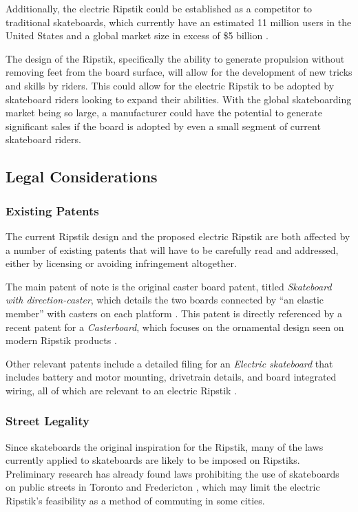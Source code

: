 Additionally, the electric Ripstik could be established as a competitor to traditional skateboards, which currently have an estimated 11 million users in the United States and a global market size in excess of \$5 billion \cite{Skateboarding}.

The design of the Ripstik, specifically the ability to generate propulsion without removing feet from the board surface, will allow for the development of new tricks and skills by riders. This could allow for the electric Ripstik to be adopted by skateboard riders looking to expand their abilities. With the global skateboarding market being so large, a manufacturer could have the potential to generate significant sales if the board is adopted by even a small segment of current skateboard riders.
\subsection{Legal Considerations}
\subsubsection{Existing Patents}
The current Ripstik design and the proposed electric Ripstik are both affected by a number of existing patents that will have to be carefully read and addressed, either by licensing or avoiding infringement altogether. 

The main patent of note is the original caster board patent, titled \textit{Skateboard with direction-caster}, which details the two boards connected by ``an elastic member'' with casters on each platform \cite{directionCasterPatent}. This patent is directly referenced by a recent patent for a \textit{Casterboard}, which focuses on the ornamental design seen on modern Ripstik products \cite{casterboardPatent}.

Other relevant patents include a detailed filing for an \textit{Electric skateboard} that includes battery and motor mounting, drivetrain details, and board integrated wiring, all of which are relevant to an electric Ripstik \cite{electricSkateboardPatent}.
\subsubsection{Street Legality}
Since skateboards the original inspiration for the Ripstik, many of the laws currently applied to skateboards are likely to be imposed on Ripstiks. Preliminary research has already found laws prohibiting the use of skateboards on public streets in Toronto and Fredericton \cite{TOLaws}, which may limit the electric Ripstik's feasibility as a method of commuting in some cities.

